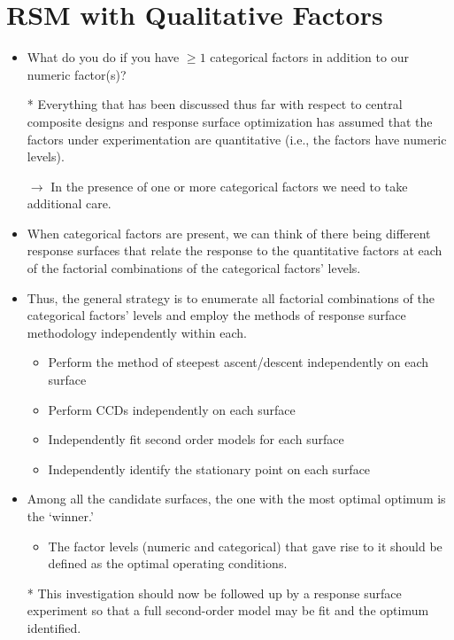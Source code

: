 \section{RSM with Qualitative Factors}
\begin{itemize}
    \item What do you do if you have $ \ge 1 $ categorical factors in addition to our numeric factor(s)?
    \item[*] Everything that has been discussed thus far with respect to central composite designs and response
        surface optimization has assumed that the factors under experimentation are quantitative (i.e., the factors
        have numeric levels).
    \item[$\rightarrow$] In the presence of one or more categorical factors we need to take additional care.
    \item When categorical factors are present, we can think of there being different response surfaces that relate
          the response to the quantitative factors at each of the factorial combinations of the categorical factors'
          levels.
    \item Thus, the general strategy is to enumerate all factorial combinations of the categorical factors' levels
          and employ the methods of response surface methodology independently within each.
          \begin{itemize}
              \item Perform the method of steepest ascent/descent independently on each surface
              \item Perform CCDs independently on each surface
              \item Independently fit second order models for each surface
              \item Independently identify the stationary point on each surface
          \end{itemize}
    \item Among all the candidate surfaces, the one with the most optimal optimum is the `winner.'
          \begin{itemize}
              \item The factor levels (numeric and categorical) that gave rise to it should be defined as the optimal
                    operating conditions.
          \end{itemize}
    \item[*] This investigation should now be followed up by a response surface experiment so that a full second-order model may be fit and the optimum identified.

\end{itemize}
